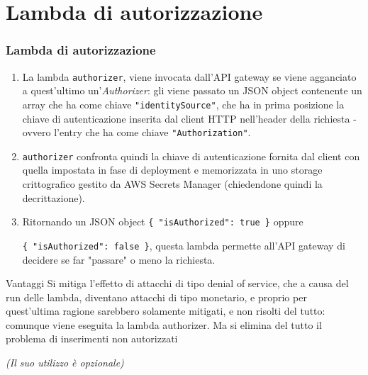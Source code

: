\documentclass{beamer}
\begin{document}
\section{Lambda di autorizzazione}
\begin{frame}
    \frametitle{Lambda di autorizzazione}

    \fontsize{9pt}{10pt}\selectfont

    \begin{enumerate}

        \item La lambda \texttt{authorizer}, viene invocata dall'API gateway se viene agganciato a quest'ultimo 
        un'\textit{Authorizer}: gli viene passato un JSON object contenente un array che ha come chiave 
        \texttt{"identitySource"}, che ha in prima posizione la chiave di autenticazione inserita dal client HTTP 
        nell'header della richiesta - ovvero l'entry che ha come chiave \texttt{"Authorization"}.


        \item \texttt{authorizer} confronta quindi la chiave di autenticazione fornita dal client con quella impostata
        in fase di deployment e memorizzata in uno storage crittografico gestito da AWS Secrets Manager (chiedendone
        quindi la decrittazione).

        \item Ritornando un JSON object \texttt{\{ "isAuthorized": true \}} oppure 
    
        \texttt{\{ "isAuthorized": false \}}, 
        questa lambda permette all'API gateway di decidere se far "passare" o meno la richiesta.
        
    \end{enumerate}

    \begin{exampleblock}{Vantaggi}
    Si mitiga l'effetto di attacchi di tipo denial of service, che a causa del run delle lambda, diventano attacchi
    di tipo monetario, e proprio per quest'ultima ragione sarebbero solamente mitigati, e non risolti del tutto: comunque viene eseguita la lambda authorizer. Ma si elimina del tutto il problema di inserimenti non autorizzati
    \end{exampleblock}

    \fontsize{6pt}{10pt}\selectfont
    \centering
    \textit{(Il suo utilizzo è opzionale)}
    
\end{frame}
\end{document}
